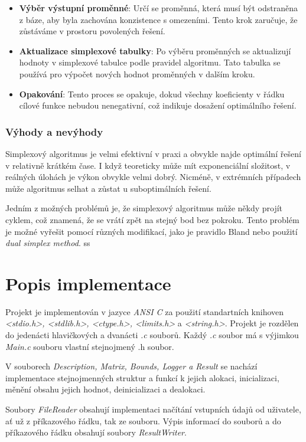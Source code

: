 \documentclass[
12pt,
a4paper,
pdftex,
czech,
titlepage
]{report}
\begin{document}
\begin{itemize}[label={}]
\begin{itemize}
    \item \textbf{Výběr výstupní proměnné}: Určí se proměnná, která musí být odstraněna z báze, aby byla zachována konzistence s omezeními. Tento krok zaručuje, že zůstáváme v prostoru povolených řešení.
    
    \item \textbf{Aktualizace simplexové tabulky}: Po výběru proměnných se aktualizují hodnoty v simplexové tabulce podle pravidel algoritmu. Tato tabulka se používá pro výpočet nových hodnot proměnných v dalším kroku.
    
    \item \textbf{Opakování}: Tento proces se opakuje, dokud všechny koeficienty v řádku cílové funkce nebudou nenegativní, což indikuje dosažení optimálního řešení.
\end{itemize}

\subsection*{Výhody a nevýhody}

Simplexový algoritmus je velmi efektivní v praxi a obvykle najde optimální řešení v relativně krátkém čase. I když teoreticky může mít exponenciální složitost, v reálných úlohách je výkon obvykle velmi dobrý. Nicméně, v extrémních případech může algoritmus selhat a zůstat u suboptimálních řešení.

Jedním z možných problémů je, že simplexový algoritmus může někdy projít cyklem, což znamená, že se vrátí zpět na stejný bod bez pokroku. Tento problém je možné vyřešit pomocí různých modifikací, jako je pravidlo Bland nebo použití \textit{dual simplex method}.
ss
\chapter{Popis implementace}

Projekt je implementován v jazyce \textit{ANSI C} za použití standartních knihoven \textit{<stdio.h>, <stdlib.h>, <ctype.h>, <limits.h>} a \textit{<string.h>}.
Projekt je rozdělen do jedenácti hlavičkových a dvanácti \textit{.c} souborů. Každý \textit{.c} soubor má s výjimkou \textit{Main.c} souboru vlastní stejnojmený .h soubor.

V souborech \textit{Description, Matrix, Bounds, Logger a Result} se nachází implementace stejnojmenných struktur a funkcí k jejich alokaci, inicializaci, měnění obsahu jejich hodnot, deinicializaci a dealokaci. 

Soubory \textit{FileReader} obsahují implementaci načítání vstupních údajů od uživatele, ať už z příkazového řádku, tak ze souboru.
Výpis informací do souborů a do příkazového řádku obsahují soubory \textit{ResultWriter}.


\end{itemize}
\end{document}
